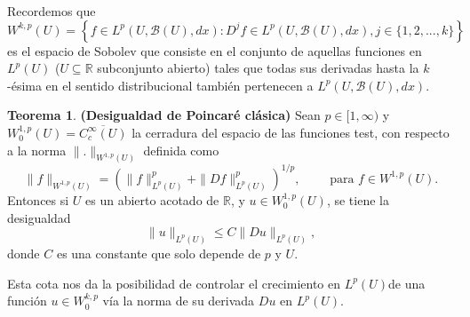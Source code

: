 \documentclass[letterpaper,twoside,12pt]{book}
\newcommand{\R}{\mathbb{R}}
\newcommand{\B}{\mathcal{B}}
\newcommand{\1}{\mathds{1}}
\theoremstyle{definition}
\theoremstyle{definition}
\newtheorem{teo}{Teorema}
\theoremstyle{remark}
\theoremstyle{definition}
\theoremstyle{definition}
\theoremstyle{definition}
\theoremstyle{definition}
\theoremstyle{definition}
\begin{document}
Recordemos que 
\[
W^{k,p}(U)=\left\{f\in L^{p}(U,\B(U),dx): D^jf\in L^p(U,\B(U),dx), j\in \{1,2,...,k\}\right\}
\]
es el espacio de Sobolev que consiste en el conjunto de aquellas funciones en $L^p(U)$ ($U\subseteq \R$ subconjunto abierto) tales que todas sus derivadas hasta la $k$-ésima en el sentido distribucional también pertenecen a $L^p(U,\B(U),dx)$.

\begin{teo}\textbf{(Desigualdad de Poincaré clásica)}
   Sean $p\in [1,\infty)$ y $W_0^{1,p}(U)=\overline{C^{\infty}_c(U)}$ la cerradura del espacio de las funciones test, con respecto a la norma $\|.\|_{W^{1,p}(U)}$ definida como
   \[
     \|f\|_{W^{1,p}(U)}=\left(\|f\|_{L^{p}(U)}^p+\|Df\|_{L^p(U)}^p\right)^{1/p}, \qquad \text{ para } f\in W^{1,p}(U).
    \]
   Entonces si $U$ es un abierto acotado de $\R$, y $u\in W_0^{1,p}(U)$, se tiene la desigualdad 
   \[
   \|u\|_{L^{p}(U)}\leq C\|Du\|_{L^p(U)},   
   \]
   donde $C$ es una constante que solo depende de $p$ y $U$. 
   \end{teo}
   Esta cota nos da la posibilidad de controlar el crecimiento en $L^p(U)$de una función $u\in W_0^{k,p}$ vía la norma de su derivada $Du$ en $L^p(U)$.
\end{document}
